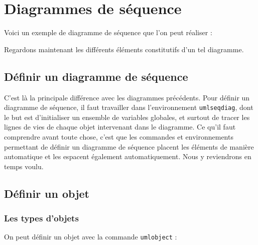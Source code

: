 \documentclass[a4paper,11pt]{report}
\newcommand{\inputTikZ}[1]{%
  }%
\newcommand{\inputTikZ}[1]{%
    \texttt{[image: fig/\#1.pdf]}%
  }%
\begin{document}
\begin{center}
\inputTikZ{statediagstep3}
\end{center}

%
\chapter{Diagrammes de séquence}\label{c.seq}

Voici un exemple de diagramme de séquence que l'on peut réaliser :

\begin{center}
\inputTikZ{seqdiagex}
\end{center}

Regardons maintenant les différents éléments constitutifs d'un tel diagramme.

\section{Définir un diagramme de séquence}\label{s.seqdiag}

C'est là la principale différence avec les diagrammes précédents. Pour définir un diagramme de séquence, il faut travailler dans l'environnement {\tt umlseqdiag}, dont le but est d'initialiser un ensemble de variables globales, et surtout de tracer les lignes de vies de chaque objet intervenant dans le diagramme. Ce qu'il faut comprendre avant toute chose, c'est que les commandes et environnements permettant de définir un diagramme de séquence placent les éléments de manière automatique et les espacent également automatiquement. Nous y reviendrons en temps voulu.

\section{Définir un objet}\label{s.objs}

\subsection{Les types d'objets}\label{ss.obj}

On peut définir un objet avec la commande {\tt umlobject} :

\medskip

\begin{minipage}{0.5\textwidth}

\end{minipage}
\begin{minipage}{0.5\textwidth}
\begin{center}
\inputTikZ{object}
\end{center}
\end{minipage}
\end{document}
